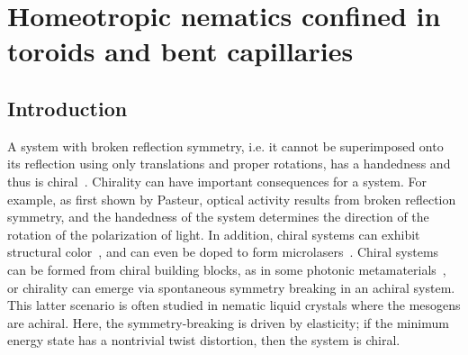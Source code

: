 \chapter{Homeotropic nematics confined in toroids and bent capillaries}

\section{Introduction}
A system with broken reflection symmetry, i.e. it cannot be superimposed onto its reflection using only translations and proper rotations, has a handedness and thus is chiral~\cite{RN175}.
Chirality can have important consequences for a system.
For example, as first shown by Pasteur, optical activity results from broken reflection symmetry, and the handedness of the system determines the direction of the rotation of the polarization of light\cite{RN291}.
In addition, chiral systems can exhibit structural color~\cite{RN308,RN307}, and can even be doped to form microlasers~\cite{RN305,RN306}.
Chiral systems can be formed from chiral building blocks, as in some photonic metamaterials~\cite{RN304}, or chirality can emerge via spontaneous symmetry breaking in an achiral system\cite{RN294}.
This latter scenario is often studied in nematic liquid crystals where the mesogens are achiral\cite{RN297,RN296,RN298,RN295,RN299,RN193,RN46,RN192,RN191,RN293,RN302}.
Here, the symmetry-breaking is driven by elasticity; if the minimum energy state has a nontrivial twist distortion, then the system is chiral.


